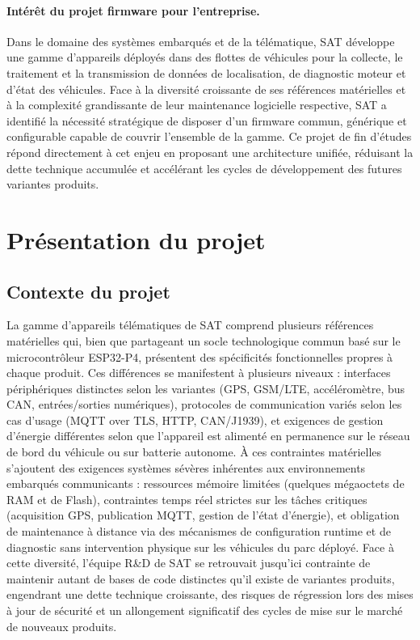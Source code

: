 \paragraph{Intérêt du projet firmware pour l'entreprise.}
Dans le domaine des systèmes embarqués et de la télématique, SAT
développe une gamme d'appareils déployés dans des flottes de véhicules
pour la collecte, le traitement et la transmission de données de
localisation, de diagnostic moteur et d'état des véhicules. Face à la
diversité croissante de ses références matérielles et à la complexité
grandissante de leur maintenance logicielle respective, SAT a identifié
la nécessité stratégique de disposer d'un firmware commun, générique
et configurable capable de couvrir l'ensemble de la gamme. Ce projet
de fin d'études répond directement à cet enjeu en proposant une
architecture unifiée, réduisant la dette technique accumulée et
accélérant les cycles de développement des futures variantes produits.

\section{Présentation du projet}
\label{sec:projet}

\subsection{Contexte du projet}
\label{subsec:contexte}

La gamme d'appareils télématiques de SAT comprend plusieurs références
matérielles qui, bien que partageant un socle technologique commun basé
sur le microcontrôleur ESP32-P4, présentent des spécificités
fonctionnelles propres à chaque produit. Ces différences se manifestent
à plusieurs niveaux : interfaces périphériques distinctes selon les
variantes (GPS, GSM/LTE, accéléromètre, bus CAN, entrées/sorties
numériques), protocoles de communication variés selon les cas d'usage
(MQTT over TLS, HTTP, CAN/J1939), et exigences de gestion d'énergie
différentes selon que l'appareil est alimenté en permanence sur le
réseau de bord du véhicule ou sur batterie autonome. À ces contraintes
matérielles s'ajoutent des exigences systèmes sévères inhérentes aux
environnements embarqués communicants : ressources mémoire limitées
(quelques mégaoctets de RAM et de Flash), contraintes temps réel
strictes sur les tâches critiques (acquisition GPS, publication MQTT,
gestion de l'état d'énergie), et obligation de maintenance à distance
via des mécanismes de configuration runtime et de diagnostic sans
intervention physique sur les véhicules du parc déployé. Face à cette
diversité, l'équipe R\&D de SAT se retrouvait jusqu'ici contrainte de
maintenir autant de bases de code distinctes qu'il existe de variantes
produits, engendrant une dette technique croissante, des risques de
régression lors des mises à jour de sécurité et un allongement
significatif des cycles de mise sur le marché de nouveaux produits.

